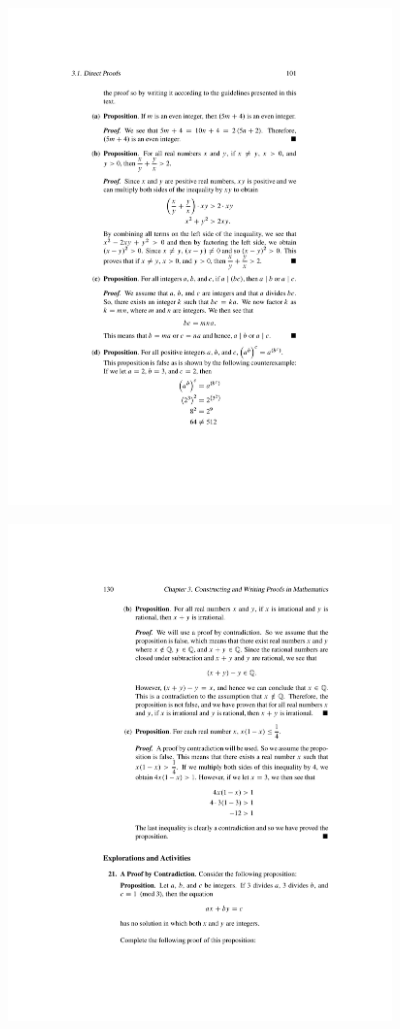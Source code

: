 \documentclass[palatino]{beamer}
\begin{document}
\begin{frame}
	\begin{center}
		\includegraphics[width=4in]{exam1-proofanalysis4}
	\end{center}
\end{frame}


\begin{frame}
	\begin{center}
		\includegraphics[width=4in]{exam1-proofanalysis2}
	\end{center}
\end{frame}
\end{document}
